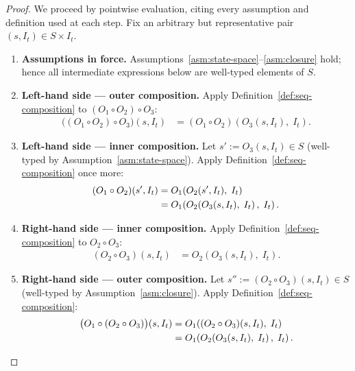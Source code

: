 \documentclass[12pt,openany]{book}
\newcommand{\calI}{\mathcal{I}}
\numberwithin{equation}{chapter}
\theoremstyle{plain}
\theoremstyle{definition}
\theoremstyle{remark}
\numberwithin{equation}{chapter}
\theoremstyle{plain}
\newcommand{\calS}{\mathcal{S}}
\def\calI{I}%
\def\calS{S}%
\begin{document}
\begin{proof}
We proceed by pointwise evaluation, citing every assumption and
definition used at each step.  Fix an arbitrary but representative
pair $(s, \calI_t) \in \calS \times \calI_t$.

\begin{enumerate}
  \item \textbf{Assumptions in force.}
        Assumptions~\ref{asm:state-space}--\ref{asm:closure} hold;
        hence all intermediate expressions below are well-typed
        elements of $\calS$.

  \item \textbf{Left-hand side --- outer composition.}
        Apply Definition~\ref{def:seq-composition} to
        $(O_1 \circ O_2) \circ O_3$:
        \begin{align}
          \bigl((O_1 \circ O_2) \circ O_3\bigr)(s, \calI_t)
          &= (O_1 \circ O_2)\!\left(O_3(s, \calI_t),\; \calI_t\right).
          \label{eq:assoc-step1}
        \end{align}

  \item \textbf{Left-hand side --- inner composition.}
        Let $s' := O_3(s, \calI_t) \in \calS$
        (well-typed by Assumption~\ref{asm:state-space}).
        Apply Definition~\ref{def:seq-composition} once more:
        \begin{align}
          (O_1 \circ O_2)(s', \calI_t)
          &= O_1\!\left(O_2(s', \calI_t),\; \calI_t\right) \notag\\
          &= O_1\!\left(
               O_2\!\left(O_3(s, \calI_t),\; \calI_t\right),\;
               \calI_t
             \right).
          \label{eq:assoc-step2}
        \end{align}

  \item \textbf{Right-hand side --- inner composition.}
        Apply Definition~\ref{def:seq-composition} to
        $O_2 \circ O_3$:
        \begin{align}
          (O_2 \circ O_3)(s, \calI_t)
          &= O_2\!\left(O_3(s, \calI_t),\; \calI_t\right).
          \label{eq:assoc-step3}
        \end{align}

  \item \textbf{Right-hand side --- outer composition.}
        Let $s'' := (O_2 \circ O_3)(s, \calI_t) \in \calS$
        (well-typed by Assumption~\ref{asm:closure}).
        Apply Definition~\ref{def:seq-composition}:
        \begin{align}
          \bigl(O_1 \circ (O_2 \circ O_3)\bigr)(s, \calI_t)
          &= O_1\!\left((O_2 \circ O_3)(s, \calI_t),\; \calI_t\right)
          \notag\\
          &= O_1\!\left(
               O_2\!\left(O_3(s, \calI_t),\; \calI_t\right),\;
               \calI_t
             \right).
          \label{eq:assoc-step4}
        \end{align}


\end{enumerate}
\end{proof}
\end{document}
